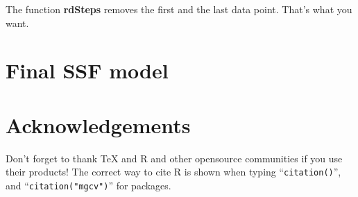 \documentclass[11pt, a4paper]{article}\usepackage[]{graphicx}\usepackage[]{color}
\begin{document}
The function \textbf{rdSteps} removes the first and the last data point. That's what you want. 

\section{Final SSF model}


\section{Acknowledgements}
Don't forget to thank TeX and R and other opensource communities if you use their products! The correct way to cite R is shown when typing ``\texttt{citation()}'', and ``\texttt{citation("mgcv")}'' for packages.
\end{document}
